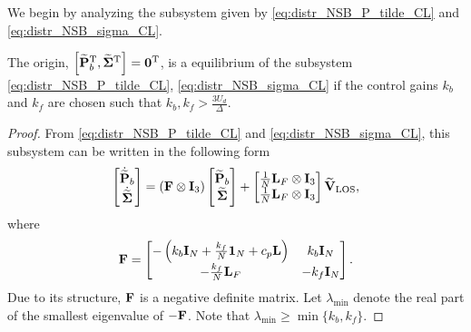 We begin by analyzing the subsystem given by \eqref{eq:distr_NSB_P_tilde_CL} and \eqref{eq:distr_NSB_sigma_CL}.
\begin{lemma}
    \label{lemma1}
    The origin, $\left[\widetilde{\mathbf{P}}_b^{\mathrm{T}}, \widetilde{\bm{\Sigma}}^{\mathrm{T}}\right] = \mathbf{0}^{\mathrm{T}}$, is a  equilibrium of the subsystem \eqref{eq:distr_NSB_P_tilde_CL}, \eqref{eq:distr_NSB_sigma_CL} if the control gains $k_b$ and $k_f$ are chosen such that $k_b, k_f > \frac{3U_d}{\Delta}$.
\end{lemma}
\begin{proof}        
    From \eqref{eq:distr_NSB_P_tilde_CL} and \eqref{eq:distr_NSB_sigma_CL}, this subsystem can be written in the following form
    \begin{equation}
        \begin{bmatrix}
            \dot{\widetilde{\mathbf{P}}}_{b} \\ \dot{\widetilde{\bm{\Sigma}}}
        \end{bmatrix}
        =
        \left( \mathbf{F} \otimes \mathbf{I}_3 \right)
        \begin{bmatrix}
            {\widetilde{\mathbf{P}}}_{b} \\ {\widetilde{\bm{\Sigma}}}
        \end{bmatrix}
        +
        \begin{bmatrix}
            \frac{1}{N} \mathbf{L}_{F} \otimes \mathbf{I}_3 \\ \frac{1}{N} \mathbf{L}_{F} \otimes \mathbf{I}_3
        \end{bmatrix}
        \widetilde{\mathbf{V}}_{\rm LOS},
        \label{eq:distr_NSB_P_Sigma_subsystem}
    \end{equation}
    where
    \begin{equation}
        \mathbf{F} 
        =             
        \begin{bmatrix}
            -\left(k_b\mathbf{I}_N + \frac{k_f}{N}\mathbf{1}_N + c_p\mathbf{L}\right) & k_b\mathbf{I}_N \\
            -\frac{k_f}{N} \mathbf{L}_{F} & -k_f \mathbf{I}_N
        \end{bmatrix}.
    \end{equation}
    Due to its structure, $\mathbf{F}$ is a negative definite matrix.
    Let $\lambda_{\min}$ denote the real part of the smallest eigenvalue of $-\mathbf{F}$.
    Note that $\lambda_{\min} \geq \min\{k_b, k_f\}$.


\end{proof}
